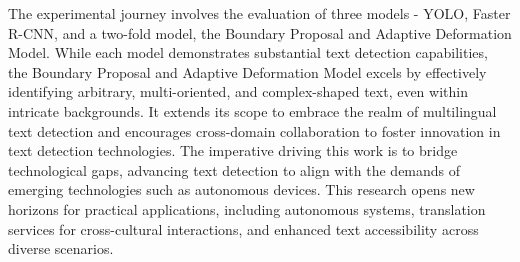 The experimental journey involves the evaluation of three models - YOLO, Faster R-CNN, and a two-fold model, the Boundary Proposal and Adaptive Deformation Model. While each model demonstrates substantial text detection capabilities, the Boundary Proposal and Adaptive Deformation Model excels by effectively identifying arbitrary, multi-oriented, and complex-shaped text, even within intricate backgrounds. It extends its scope to embrace the realm of multilingual text detection and encourages cross-domain collaboration to foster innovation in text detection technologies. The imperative driving this work is to bridge technological gaps, advancing text detection to align with the demands of emerging technologies such as autonomous devices. This research opens new horizons for practical applications, including autonomous systems, translation services for cross-cultural interactions, and enhanced text accessibility across diverse scenarios.



\setlength{\parskip}{0pt}



